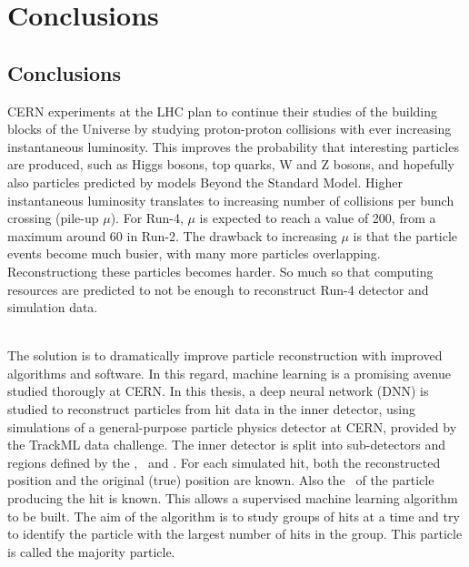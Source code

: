 \chapter{Conclusions}
\label{Conclusions}

\section{Conclusions}

CERN experiments at the LHC plan to continue their studies of the building blocks of the Universe by studying proton-proton collisions with ever increasing instantaneous luminosity. This improves the probability that interesting particles are produced, such as Higgs bosons, top quarks, W and Z bosons, and hopefully also particles predicted by models Beyond the Standard Model. Higher instantaneous luminosity translates to increasing number of collisions per bunch crossing (pile-up $\mu$). For Run-4, $\mu$ is expected to reach a value of 200, from a maximum around 60 in Run-2. The drawback to increasing $\mu$ is that the particle events become much busier, with many more particles overlapping. Reconstructiong these particles becomes harder. So much so that computing resources are predicted to not be enough to reconstruct Run-4 detector and simulation data. 

\ \\The solution is to dramatically improve particle reconstruction with improved algorithms and software. In this regard, machine learning is a promising avenue studied thorougly at CERN. In this thesis, a deep neural network (DNN) is studied to reconstruct particles from hit data in the inner detector, using simulations of a general-purpose particle physics detector at CERN, provided by the TrackML data challenge. The inner detector is split into sub-detectors and regions defined by the \volumeID, \layerID~and \moduleID. For each simulated hit, both the reconstructed position and the original (true) position are known. Also the \particleID~of the particle producing the hit is known. This allows a supervised machine learning algorithm to be built. The aim of the algorithm is to study groups of hits at a time and try to identify the particle with the largest number of hits in the group. This particle is called the majority particle.

